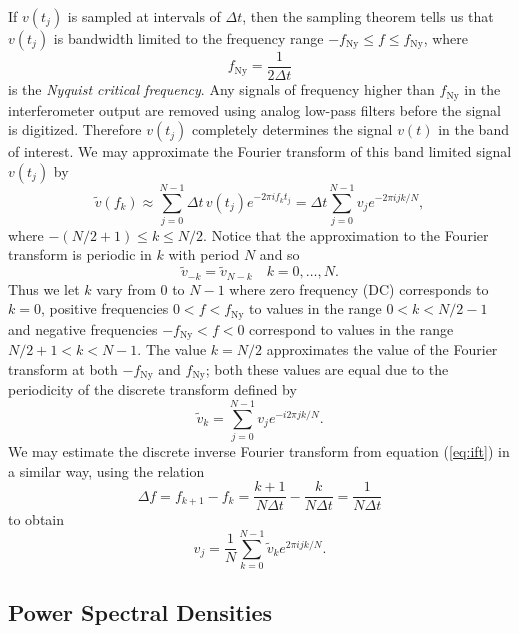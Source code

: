 If $v(t_j)$ is sampled at intervals of $\Delta t$, then the sampling
theorem\cite{Press:1992} tells us that $v(t_j)$ is bandwidth limited to the
frequency range $-f_\mathrm{Ny} \le f \le f_\mathrm{Ny}$, where
\begin{equation}
f_\mathrm{Ny} = \frac{1}{2\Delta t}
\end{equation}
is the \emph{Nyquist critical frequency}. Any signals of frequency higher than
$f_\mathrm{Ny}$ in the interferometer output are removed using analog low-pass
filters before the signal is digitized. Therefore $v(t_j)$ completely
determines the signal $v(t)$ in the band of interest. We may approximate the
Fourier transform of this band limited signal $v(t_j)$ by
\begin{equation}
\tilde{v}(f_k) \approx \sum_{j=0}^{N-1} \Delta t\, v(t_j) e^{-2 \pi i f_k t_j}
= \Delta t \sum_{j=0}^{N-1} v_j e^{-2 \pi i j k / N},
\label{eq:fftapprox}
\end{equation}
where $-(N/2 + 1) \le k \le N/2$.
Notice that the approximation to the Fourier transform is periodic in $k$ with
period $N$ and so 
\begin{equation}
\tilde{v}_{-k} = \tilde{v}_{N-k}\quad k = 0, \ldots, N.
\end{equation}
Thus we let $k$ vary from $0$ to $N-1$ where zero frequency (DC) corresponds
to $k=0$, positive frequencies $0 < f < f_\mathrm{Ny}$ to values in the range
$0 < k < N/2-1$ and negative frequencies $-f_\mathrm{Ny} < f < 0$ correspond
to values in the range $N/2+1 < k < N-1$. The value $k = N/2$ approximates the
value of the Fourier transform at both $-f_\mathrm{Ny}$ and $f_\mathrm{Ny}$;
both these values are equal due to the periodicity of the discrete transform 
defined by\cite{Anderson:2001a}
\begin{equation}
\tilde{v}_k = \sum_{j=0}^{N-1} v_j e^{-i 2 \pi j k / N}.
\label{eq:dftdef}
\end{equation}
We may estimate the discrete inverse Fourier transform from equation
(\ref{eq:ift}) in a similar way, using the relation
\begin{equation}
\Delta f = f_{k+1} - f_k = \frac{k+1}{N\Delta t} - \frac{k}{N\Delta t} =
\frac{1}{N\Delta t}
\end{equation}
to obtain
\begin{equation}
v_j = \frac{1}{N} \sum_{k=0}^{N-1} \tilde{v}_k e^{2 \pi i j k / N}.
\end{equation}

\subsection{Power Spectral Densities}
\label{ss:psdconv}

